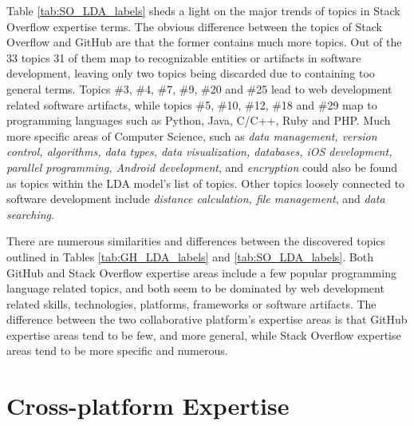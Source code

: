             Table \ref{tab:SO_LDA_labels} sheds a light on the major trends of topics in Stack Overflow expertise terms. The obvious difference between the topics of Stack Overflow and GitHub are that the former contains much more topics. Out of the 33 topics 31 of them map to recognizable entities or artifacts in software development, leaving only two topics being discarded due to containing too general terms. Topics \#3, \#4, \#7, \#9, \#20 and \#25 lead to web development related software artifacts, while topics \#5, \#10, \#12, \#18 and \#29 map to programming languages such as Python, Java, C/C++, Ruby and PHP. Much more specific areas of Computer Science, such as \emph{data management, version control, algorithms, data types, data visualization, databases, iOS development, parallel programming, Android development}, and \emph{encryption} could also be found as topics within the LDA model's list of topics. Other topics loosely connected to software development include \emph{distance calculation, file management}, and \emph{data searching}.
            
            There are numerous similarities and differences between the discovered topics outlined in Tables \ref{tab:GH_LDA_labels} and \ref{tab:SO_LDA_labels}. Both GitHub and Stack Overflow expertise areas include a few popular programming language related topics, and both seem to be dominated by web development related skills, technologies, platforms, frameworks or software artifacts. The difference between the two collaborative platform's expertise areas is that GitHub expertise areas tend to be few, and more general, while Stack Overflow expertise areas tend to be more specific and numerous.  \\
        
    
    \section{Cross-platform Expertise\label{sec:results_rq2}}
        
